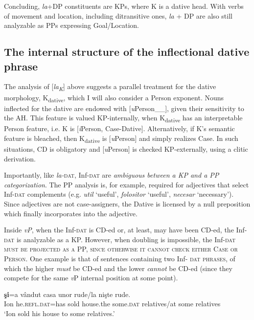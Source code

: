 \documentclass[output=paper,colorlinks,citecolor=brown,nonflat]{langsci/langscibook}
\begin{document}
Concluding, \textit{la}+DP constituents are KPs, where K is a dative head. With verbs of movement and location, including ditransitive ones, \textit{la} + DP are also still analyzable as PPs expressing Goal/Location.

\subsection{{The} {internal} {structure} {of} {the} {inflectional} {dative} {phrase}}%
\label{sec:cornilescu:2.4}

The analysis of [\textit{la\textsubscript{K}}] above suggests a parallel treatment for the dative morphology, K\textsubscript{dative}, which I will also consider a Person exponent. Nouns inflected for the dative are endowed with [\textit{u}Person\_\_], given their sensitivity to the AH. This feature is valued KP-internally, when K\textsubscript{dative} has an interpretable Person feature, i.e. K is [\textit{i}Person, Case-Dative{\longrule}]. Alternatively, if K’s semantic feature is bleached, then K\textsubscript{dative} is [\textit{u}Person] and simply realizes Case. In such situations, CD is obligatory and [\textit{u}Person] is checked KP-externally, using a clitic derivation.

Importantly, like \textit{la-}\textsc{dat}, Inf-\textsc{dat} are \textit{ambiguous between a KP and a PP categorization}. The PP analysis is, for example, required for adjectives that select Inf-\textsc{dat} complements (e.g. \textit{util} ‘useful’, \textit{folositor} ‘useful’, \textit{necesar} ‘necessary’). Since adjectives are not case-assigners, the Dative is licensed by a null preposition which finally incorporates into the adjective.

Inside \textit{vP}, when the Inf-\textsc{dat} is CD-ed or, at least, may have been CD-ed, the Inf-\textsc{dat} is analyzable as a KP. However, when doubling is impossible, the Inf-\textsc{dat must be projected as a PP, since otherwise it cannot check either Case or Person}. One example is that of sentences containing two Inf- \textsc{dat} \textsc{phrases}, of which the higher \textit{must} be CD-ed and the lower \textit{cannot} be CD-ed (since they compete for the same \textit{v}P internal position at some point).

\ea%
      \label{ex:cornilescu:18}
       \textbf{{şi}}{=a} {vândut} {casa} {unor} rude/la {nişte} {rude}.\\
           Ion he.\textsc{refl}.\textsc{dat}=has sold house.the some.\textsc{dat} relatives/{at} some relatives \\
      \glt ‘Ion sold his house to some relatives.’
   \z
\end{document}
